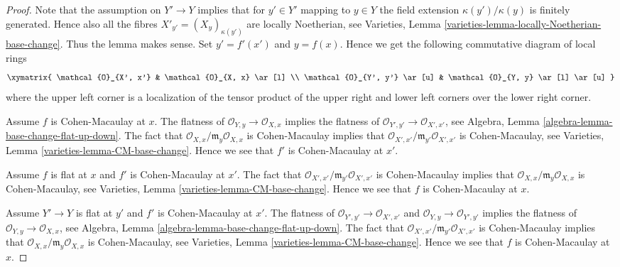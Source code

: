 \begin{proof}
Note that the assumption on $Y' \to Y$ implies that for $y' \in Y'$
mapping to $y \in Y$ the field extension $\kappa(y')/\kappa(y)$
is finitely generated. Hence also all the fibres
$X'_{y'} = (X_y)_{\kappa(y')}$ are locally Noetherian, see
Varieties, Lemma \ref{varieties-lemma-locally-Noetherian-base-change}.
Thus the lemma makes sense. Set $y' = f'(x')$ and $y = f(x)$.
Hence we get the following commutative diagram of local rings
$$
\xymatrix{
\mathcal{O}_{X', x'} & \mathcal{O}_{X, x} \ar[l] \\
\mathcal{O}_{Y', y'} \ar[u] & \mathcal{O}_{Y, y} \ar[l] \ar[u]
}
$$
where the upper left corner is a localization of the tensor product
of the upper right and lower left corners over the lower right corner.

\medskip\noindent
Assume $f$ is Cohen-Macaulay at $x$.
The flatness of $\mathcal{O}_{Y, y} \to \mathcal{O}_{X, x}$
implies the flatness of $\mathcal{O}_{Y', y'} \to \mathcal{O}_{X', x'}$, see
Algebra, Lemma \ref{algebra-lemma-base-change-flat-up-down}.
The fact that $\mathcal{O}_{X, x}/\mathfrak m_y\mathcal{O}_{X, x}$
is Cohen-Macaulay implies that
$\mathcal{O}_{X', x'}/\mathfrak m_{y'}\mathcal{O}_{X', x'}$
is Cohen-Macaulay, see
Varieties, Lemma \ref{varieties-lemma-CM-base-change}. Hence we see that $f'$
is Cohen-Macaulay at $x'$.

\medskip\noindent
Assume $f$ is flat at $x$ and $f'$ is Cohen-Macaulay at $x'$.
The fact that $\mathcal{O}_{X', x'}/\mathfrak m_{y'}\mathcal{O}_{X', x'}$
is Cohen-Macaulay implies that
$\mathcal{O}_{X, x}/\mathfrak m_y\mathcal{O}_{X, x}$
is Cohen-Macaulay, see
Varieties, Lemma \ref{varieties-lemma-CM-base-change}.
Hence we see that $f$ is Cohen-Macaulay at $x$.

\medskip\noindent
Assume $Y' \to Y$ is flat at $y'$ and $f'$ is Cohen-Macaulay at
$x'$. The flatness of $\mathcal{O}_{Y', y'} \to \mathcal{O}_{X', x'}$
and $\mathcal{O}_{Y, y} \to \mathcal{O}_{Y', y'}$ implies the flatness
of $\mathcal{O}_{Y, y} \to \mathcal{O}_{X, x}$, see
Algebra, Lemma \ref{algebra-lemma-base-change-flat-up-down}.
The fact that $\mathcal{O}_{X', x'}/\mathfrak m_{y'}\mathcal{O}_{X', x'}$
is Cohen-Macaulay implies that
$\mathcal{O}_{X, x}/\mathfrak m_y\mathcal{O}_{X, x}$
is Cohen-Macaulay, see
Varieties, Lemma \ref{varieties-lemma-CM-base-change}. Hence we see that $f$
is Cohen-Macaulay at $x$.
\end{proof}

